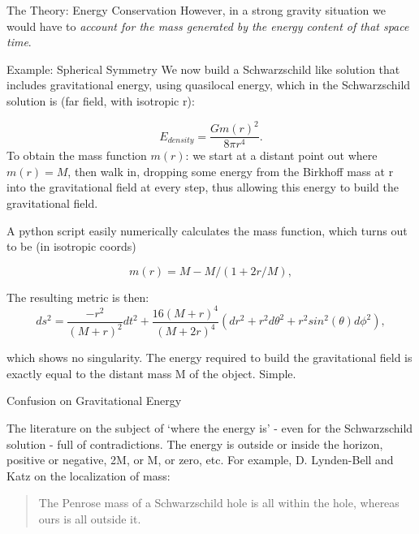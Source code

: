 \documentclass[final]{beamer}
\newlength{\colwidth}
\begin{document}
\begin{frame}[t]
\begin{columns}[t]
\begin{column}{\colwidth}
\begin{block}{The Theory: Energy Conservation}
	However, in a strong gravity situation we would have to \textit{account for the mass generated by the energy content of that space time}.
\end{block}
  
  \begin{block}{Example: Spherical Symmetry }
 We now build a Schwarzschild like solution that includes gravitational energy, using quasilocal energy, which in the Schwarzschild solution is (far field, with isotropic r)\cite{lyndenbell1985}: 

\begin{equation} \label{energyDensityEqn}
	E_{density} = \frac{Gm(r)^2}{8 \pi r^4}.
\end{equation}
To obtain the mass function $m(r)$: we start at a distant point out where $m(r) = M$, then walk in, dropping some energy from the Birkhoff mass at r into the gravitational field at every step, thus allowing this energy to build the gravitational field.
	
A python script\cite{RzeroJupyterGravitationalEnergyipynb} easily numerically calculates the mass function, which turns out to be (in isotropic coords)

\begin{equation}
	m(r) = M - M/(1 + 2r/M),
\end{equation}

The resulting metric is then:
		\begin{equation} \label{lineElement}
			ds^2 = \frac{-r^2}{(M+r)^2}dt^2 + \frac{16(M+r)^4}{(M+2r)^4}(dr^2 + r^2d\theta^2 + r^2 sin^2(\theta)d\phi^2),
		\end{equation}

which shows no singularity. The energy required to build the gravitational field is exactly equal to the distant mass M of the object. Simple.
\end{block}

\begin{alertblock}{Confusion on Gravitational Energy}

The literature on the subject of `where the energy is' - even for the Schwarzschild solution - full of contradictions. The energy is outside or inside the horizon, positive or negative, 2M, or M, or zero, etc.  For example, D. Lynden-Bell and Katz on the localization of mass:\cite{lyndenbell1985}
\begin{quotation}
	The Penrose mass of a Schwarzschild hole is all within the hole, whereas ours is all outside it.
\end{quotation}


\end{alertblock}
\end{column}
\end{columns}
\end{frame}
\end{document}
